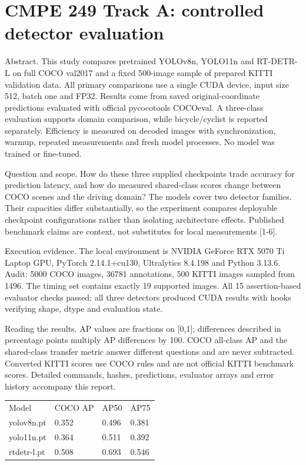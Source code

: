 \documentclass[10pt]{article}
\begin{document}
\section*{CMPE 249 Track A: controlled detector evaluation}
Abstract. This study compares pretrained YOLOv8n, YOLO11n and RT-DETR-L on full COCO val2017 and a fixed 500-image sample of prepared KITTI validation data. All primary comparisons use a single CUDA device, input size 512, batch one and FP32. Results come from saved original-coordinate predictions evaluated with official pycocotools COCOeval. A three-class evaluation supports domain comparison, while bicycle/cyclist is reported separately. Efficiency is measured on decoded images with synchronization, warmup, repeated measurements and fresh model processes. No model was trained or fine-tuned.


Question and scope. How do these three supplied checkpoints trade accuracy for prediction latency, and how do measured shared-class scores change between COCO scenes and the driving domain? The models cover two detector families. Their capacities differ substantially, so the experiment compares deployable checkpoint configurations rather than isolating architecture effects. Published benchmark claims are context, not substitutes for local measurements [1-6].


Execution evidence. The local environment is NVIDIA GeForce RTX 5070 Ti Laptop GPU, PyTorch 2.14.1+cu130, Ultralytics 8.4.198 and Python 3.13.6. Audit: 5000 COCO images, 36781 annotations, 500 KITTI images sampled from 1496. The timing set contains exactly 19 supported images. All 15 assertion-based evaluator checks passed; all three detectors produced CUDA results with hooks verifying shape, dtype and evaluation state.


Reading the results. AP values are fractions on [0,1]; differences described in percentage points multiply AP differences by 100. COCO all-class AP and the shared-class transfer metric answer different questions and are never subtracted. Converted KITTI scores use COCO rules and are not official KITTI benchmark scores. Detailed commands, hashes, predictions, evaluator arrays and error history accompany this report.


\begin{longtable}{llll}
Model & COCO AP & AP50 & AP75 \\
yolov8n.pt & 0.352 & 0.496 & 0.381 \\
yolo11n.pt & 0.364 & 0.511 & 0.392 \\
rtdetr-l.pt & 0.508 & 0.693 & 0.546 \\
\end{longtable}
\newpage
\end{document}
